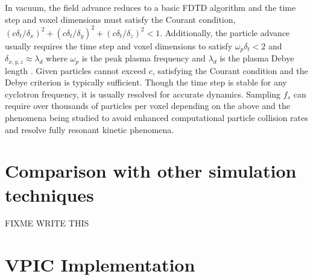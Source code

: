 \documentclass[journal,twoside]{IEEEtran}
\begin{document}
In vacuum, the field advance reduces to a basic FDTD algorithm
\cite{Yee_1966} and the time step and voxel dimensions must satisfy the
Courant condition,
$\left(c\delta_t/\delta_x\right)^2 +
 \left(c\delta_t/\delta_y\right)^2 +
 \left(c\delta_t/\delta_z\right)^2 < 1$.
Additionally, the particle advance usually requires the time step and
voxel dimensions to satisfy $\omega_p \delta_t < 2$ and
$\delta_{x,y,z}
\approx \lambda_d$ where $\omega_p$ is the peak plasma frequency and
$\lambda_d$ is the plasma Debye length
\cite{Birdsall_Langdon_1985,Hockney_Eastwood_1988}.
Given particles cannot exceed $c$, satisfying the Courant condition
and the Debye criterion is typically sufficient.  Though the time step
is stable for any cyclotron frequency, it is usually resolved for
accurate dynamics.  Sampling $f_s$ can require over thousands of
particles per voxel depending on the above and the phenomena being
studied to avoid enhanced computational particle collision rates and
resolve fully resonant kinetic phenomena.

\section{Comparison with other simulation techniques}

FIXME WRITE THIS

\section{VPIC Implementation}
\end{document}
